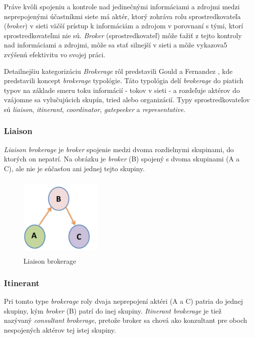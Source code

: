 \documentclass[slovak,master,public,dept460,male,cpdeclaration,oneside]{diploma}
\begin{document}
Práve kvôli spojeniu a kontrole nad jedinečnými informáciami a zdrojmi medzi neprepojenými účastníkmi siete má aktér, ktorý zohráva rolu sprostredkovateľa (\textit{broker}) v sieti väčší prístup k informáciám a zdrojom v porovnaní s tými, ktorí sprostredkovateľmi nie sú. \textit{Broker} (sprostredkovateľ) môže ťažiť z tejto kontroly nad informáciami a zdrojmi, môže sa stať silnejší v sieti a môže vykazova5 zvýšenú efektivitu vo svojej práci. \cite{16}


Detailnejšiu kategorizáciu \textit{Brokerage} rôl predstavili Gould a Fernandez \cite{15}, kde predstavili koncept \textit{brokerage} typológie. Táto typológia delí \textit{brokerage} do piatich typov na základe smeru toku informácií - tokov v sieti - a rozdeľuje aktérov do vzájomne sa vylučujúcich skupín, tried alebo organizácií.
Typy sprostredkovateľov sú \textit{liaison}, \textit{itinerant}, \textit{coordinator}, \textit{gatepeeker} a \textit{representative}.

\subsubsection{Liaison}

\textit{Liaison brokerage} je \textit{broker} spojenie medzi dvoma rozdielnymi skupinami, do ktorých on nepatrí. Na obrázku je \textit{broker} (B) spojený s dvoma skupinami (A a C), ale nie je súčasťou ani jednej tejto skupiny. 

\begin{figure}[H]
\centering
\includegraphics[width=4cm, height=4cm]{figures/liaison}
\caption{Liaison brokerage}
\end{figure}

\subsubsection{Itinerant}
Pri tomto type \textit{brokerage} roly dvaja neprepojení aktéri (A a C) patria do jednej skupiny, kým \textit{broker} (B) patrí do inej skupiny. \textit{Itinerant brokerage} je tiež nazývaný \textit{consultant brokerage}, pretože broker sa chová ako konzultant pre oboch nespojených aktérov tej istej skupiny.
\end{document}
